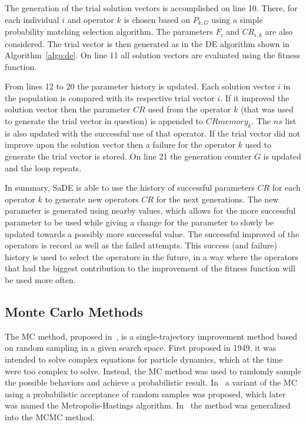 The generation of the trial solution vectors is accomplished on line 10. There,
for each individual $i$ and operator $k$ is chosen based on $P_{k,G}$ using a
simple probability matching selection algorithm. The parameters
$F_i$ and $CR_{i,k}$ are also considered. The trial vector is then
generated as in the \ac{DE} algorithm shown in Algorithm~\ref{algo:de}. On line
11 all solution vectors are evaluated using the fitness function.

From lines 12 to 20 the parameter history is updated. Each
solution vector $i$ in the population is compared with its
respective trial vector $i$. If it improved the solution vector
then the parameter $CR$ used from the operator $k$
(that was used to generate the trial vector in question) is appended
to $CRmemory_k$. The $ns$ list is also updated with the successful use of
that operator. If the trial vector did not improve upon the solution vector
then a failure for the operator $k$ used to generate the trial vector is stored.
On line 21 the generation counter $G$ is updated and the loop repeats.

In summary, \ac{SaDE} is able to use the history of successful parameters $CR$
for each operator $k$ to generate new operators $CR$ for the next generations.
The new parameter is generated using nearby values, which allows for the
more successful parameter to be used while giving a change for the 
parameter to slowly be updated towards a possibly more successful value.
The successful improved of the operators is record as well as the failed
attempts. This success (and failure) history is used to select the operators
in the future, in a way where the operators that had the biggest
contribution to the improvement of the fitness function will be used more often.

\subsection{Monte Carlo Methods} \label{sec:monte-carlo-methods}

The \ac{MC} method, proposed in~\cite{metropolis1949monte}, is a single-trajectory improvement method based on random sampling in a given search space. First proposed in
1949, it was intended to solve complex equations for particle dynamics,
which at the time were too complex to solve. Instead, the \ac{MC} method was
used to randomly sample the possible behaviors and achieve a probabilistic
result. In~\cite{metropolis1953equation} a variant of the \ac{MC} using a probabilistic
acceptance of random samples was proposed, which later was named
the Metropolis-Hastings algorithm. In~\cite{hastings1970monte} the
method was generalized into the \ac{MCMC} method.

